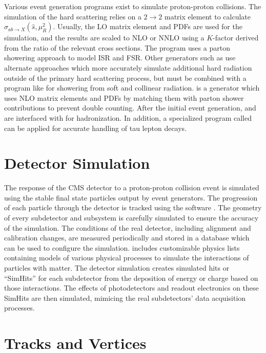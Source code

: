 Various event generation programs exist to simulate proton-proton collisions. The simulation of the hard scattering relies on a $2\rightarrow2$ matrix element to calculate $\hat{\sigma}_{ab \rightarrow X}(\hat{s},\mu_{R}^{2})$. Usually, the LO matrix element and PDFs are used for the simulation, and the results are scaled to NLO or NNLO using a $K$-factor derived from the ratio of the relevant cross sections. The program \PYTHIA \cite{Sjostrand:2006za} uses a parton showering approach to model ISR and FSR. Other generators such as \MADGRAPH \cite{MadGraph} use alternate approaches which more accurately simulate additional hard radiation outside of the primary hard scattering process, but must be combined with a program like \PYTHIA for showering from soft and collinear radiation. \POWHEG \cite{Alioli:2010xd} is a generator which uses NLO matrix elements and PDFs by matching them with parton shower contributions to prevent double counting. After the initial event generation, \MADGRAPH and \POWHEG are interfaced with \PYTHIA for hadronization. In addition, a specialized program called \TAUOLA \cite{TAUOLA} can be applied for accurate handling of tau lepton decays.

\section{Detector Simulation}

The response of the CMS detector to a proton-proton collision event is simulated using the stable final state particles output by event generators. The progression of each particle through the detector is tracked using the \GEANTfour software \cite{geant4nim,geant4ieee}. The geometry of every subdetector and subsystem is carefully simulated to ensure the accuracy of the simulation. The conditions of the real detector, including alignment and calibration changes, are measured periodically and stored in a database which can be used to configure the simulation. \GEANTfour includes customizable physics lists containing models of various physical processes to simulate the interactions of particles with matter. The detector simulation creates simulated hits or ``SimHits'' for each subdetector from the deposition of energy or charge based on those interactions. The effects of photodetectors and readout electronics on these SimHits are then simulated, mimicing the real subdetectors' data acquisition processes.

\section{Tracks and Vertices
\label{sec:tracks}}

